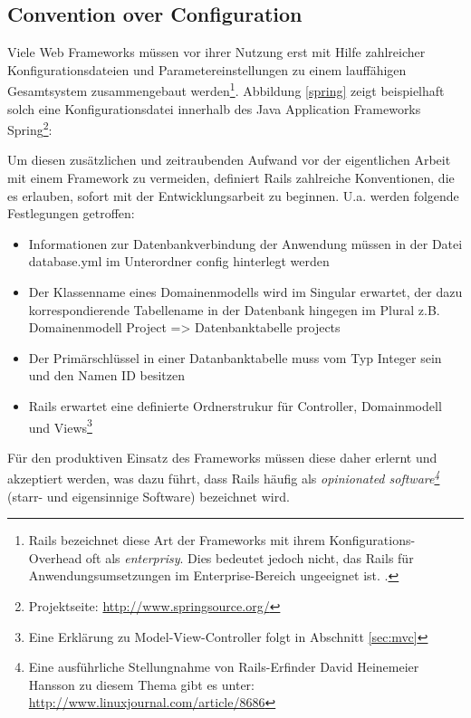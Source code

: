 \subsection{Convention over Configuration}
Viele Web Frameworks müssen vor ihrer Nutzung erst mit Hilfe zahlreicher Konfigurationsdateien und Parametereinstellungen zu einem lauffähigen Gesamtsystem zusammengebaut werden\footnote{Rails bezeichnet diese Art der Frameworks mit ihrem Konfigurations-Overhead oft als \emph{enterprisy}. Dies bedeutet jedoch nicht, das Rails für Anwendungsumsetzungen im Enterprise-Bereich ungeeignet ist. \citep[vgl.][]{enterprisy}.}. Abbildung \ref{spring} zeigt beispielhaft solch eine Konfigurationsdatei innerhalb des Java Application Frameworks Spring\footnote{Projektseite: \href{http://www.springsource.org/}{http://www.springsource.org/}}:


Um diesen zusätzlichen und zeitraubenden Aufwand vor der eigentlichen Arbeit mit einem Framework zu vermeiden, definiert Rails zahlreiche Konventionen, die es erlauben, sofort mit der Entwicklungsarbeit zu beginnen. U.a. werden folgende Festlegungen getroffen:

\begin{itemize}
\item
Informationen zur Datenbankverbindung der Anwendung müssen in der Datei database.yml im Unterordner config hinterlegt werden
\item
Der Klassenname eines Domainenmodells wird im Singular erwartet, der dazu korrespondierende Tabellename in der Datenbank hingegen im Plural z.B. Domainenmodell Project => Datenbanktabelle projects
\item
Der Primärschlüssel in einer Datanbanktabelle muss vom Typ Integer sein und den Namen ID besitzen
\item
Rails erwartet eine definierte Ordnerstrukur für Controller, Domainmodell und Views\footnote{Eine Erklärung zu Model-View-Controller folgt in Abschnitt \ref{sec:mvc}}
\end{itemize}
Für den produktiven Einsatz des Frameworks müssen diese daher erlernt und akzeptiert werden, was dazu führt, dass Rails häufig als \emph{opinionated software\footnote{Eine ausführliche Stellungnahme von Rails-Erfinder David Heinemeier Hansson zu diesem Thema gibt es unter: \href{http://www.linuxjournal.com/article/8686}{http://www.linuxjournal.com/article/8686}}} (starr- und eigensinnige Software) bezeichnet wird.

